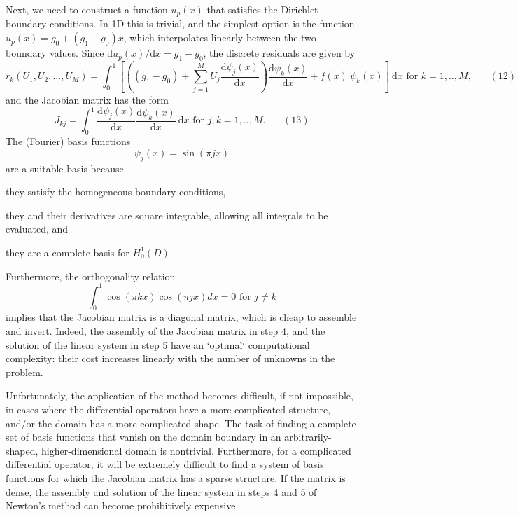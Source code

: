 Next, we need to construct a function $u_p(x)$ that satisfies the Dirichlet boundary conditions. In 1\-D this is trivial, and the simplest option is the function $ u_p(x)=g_0+ (g_1-g_0) x$, which interpolates linearly between the two boundary values. Since $ \mbox{d}u_p(x)/ \mbox{d} x = g_1-g_0$, the discrete residuals are given by \[ r_k(U_1,U_2,...,U_M) = \int_0^1 \left[ \left( (g_1 - g_0) + \sum_{j=1}^{M} U_j \frac{\mbox{d} \psi_j(x)}{\mbox{d} x} \right) \frac{\mbox{d} \psi_k(x)}{\mbox{d} x} + f(x) \ \psi_k(x) \right] \ \mbox{d}x \mbox{\ \ for $k=1,..,M$}, \ \ \ \ \ \ \ \ (12) \] and the Jacobian matrix has the form \[ J_{kj} = \int_0^1 \frac{\mbox{d} \psi_j(x)}{\mbox{d} x} \frac{\mbox{d} \psi_k(x)}{\mbox{d} x} \ \mbox{d}x \mbox{\ \ for $j,k=1,..,M$}. \ \ \ \ \ \ \ \ (13) \] The (Fourier) basis functions \[ \psi_j(x) = \sin\left(\pi j x \right)\] are a suitable basis because
\begin{DoxyItemize}
\item they satisfy the homogeneous boundary conditions,
\item they and their derivatives are square integrable, allowing all integrals to be evaluated, and
\item they are a complete basis for $ H^1_0(D)$.
\end{DoxyItemize}Furthermore, the orthogonality relation \[ \int_0^1 \cos\left(\pi k x\right) \cos\left(\pi j x\right) dx = 0 \mbox{\ \ \ for \ } j\ne k \] implies that the Jacobian matrix is a diagonal matrix, which is cheap to assemble and invert. Indeed, the assembly of the Jacobian matrix in step 4, and the solution of the linear system in step 5 have an \char`\"{}optimal\char`\"{} computational complexity\-: their cost increases linearly with the number of unknowns in the problem.

Unfortunately, the application of the method becomes difficult, if not impossible, in cases where the differential operators have a more complicated structure, and/or the domain has a more complicated shape. The task of finding a complete set of basis functions that vanish on the domain boundary in an arbitrarily-\/shaped, higher-\/dimensional domain is nontrivial. Furthermore, for a complicated differential operator, it will be extremely difficult to find a system of basis functions for which the Jacobian matrix has a sparse structure. If the matrix is dense, the assembly and solution of the linear system in steps 4 and 5 of Newton's method can become prohibitively expensive.

